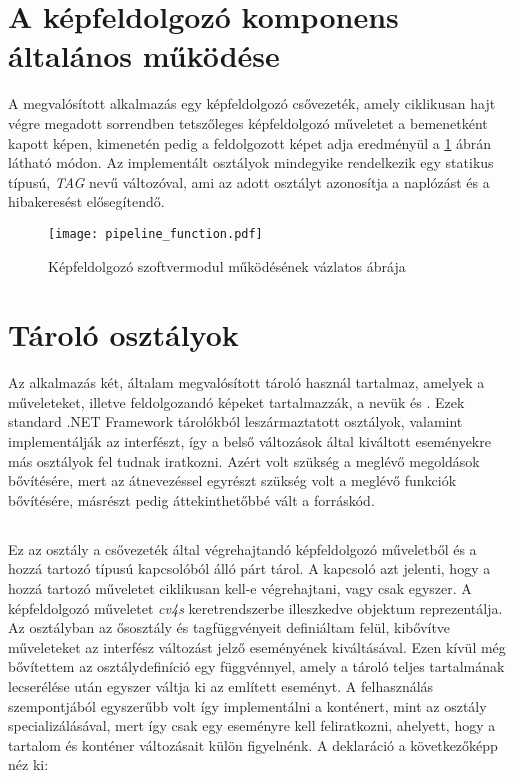 \section{A képfeldolgozó komponens általános működése}

A megvalósított alkalmazás egy képfeldolgozó csővezeték, amely ciklikusan hajt végre megadott sorrendben tetszőleges képfeldolgozó műveletet a bemenetként kapott képen, kimenetén pedig a feldolgozott képet adja eredményül a \ref{fig:pipeline_function} ábrán látható módon. Az implementált osztályok mindegyike rendelkezik egy statikus  típusú, \emph{TAG} nevű változóval, ami az adott osztályt azonosítja a naplózást és a hibakeresést elősegítendő.

\begin{figure}[h]
\vspace{.5cm}
\texttt{[image: pipeline\_function.pdf]}
\centering
\vspace{.2cm}
\caption{Képfeldolgozó szoftvermodul működésének vázlatos ábrája}
\vspace{.5cm}
\label{fig:pipeline_function}
\end{figure}

\section{Tároló osztályok}

Az alkalmazás két, általam megvalósított tároló használ tartalmaz, amelyek a műveleteket, illetve feldolgozandó képeket tartalmazzák, a nevük  és . Ezek standard .NET Framework tárolókból leszármaztatott osztályok, valamint implementálják az   interfészt, így a belső változások által kiváltott eseményekre más osztályok fel tudnak iratkozni.
Azért volt szükség a meglévő megoldások bővítésére, mert az átnevezéssel egyrészt szükség volt a meglévő funkciók bővítésére, másrészt pedig áttekinthetőbbé vált a forráskód.

\subsection{} \label{subs:OperationList}
Ez az osztály a csővezeték által végrehajtandó képfeldolgozó műveletből és a hozzá tartozó típusú kapcsolóból álló párt tárol. A kapcsoló azt jelenti, hogy a hozzá tartozó műveletet ciklikusan kell-e végrehajtani, vagy csak egyszer. A képfeldolgozó műveletet \emph{cv4s} keretrendszerbe illeszkedve  objektum reprezentálja. Az osztályban az ősosztály  és  tagfüggvényeit definiáltam felül, kibővítve műveleteket az  interfész változást jelző eseményének kiváltásával. Ezen kívül még bővítettem az osztálydefiníció egy  függvénnyel, amely a tároló teljes tartalmának lecserélése után egyszer váltja ki az említett eseményt. A felhasználás szempontjából egyszerűbb volt így implementálni a konténert, mint az  osztály specializálásával, mert így csak egy eseményre kell feliratkozni, ahelyett, hogy a tartalom és konténer változásait külön figyelnénk.  A deklaráció a következőképp néz ki:

